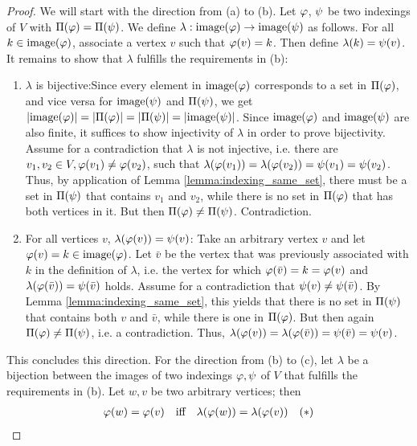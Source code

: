 \begin{proof}
    We will start with the direction from (a) to (b). Let $\varphi$, $\psi$ be two indexings of $V$ with $\Pi(\varphi) = \Pi(\psi)$. We define $\lambda : \mathrm{image}(\varphi)\rightarrow \mathrm{image}(\psi)$ as follows. For all $k \in \mathrm{image}(\varphi)$, associate a vertex $v$ such that $\varphi(v)=k$. Then define $\lambda(k)=\psi(v)$. It remains to show that $\lambda$ fulfills the requirements in (b):
    \begin{enumerate}
        \item $\lambda$ is bijective:\quad Since every element in $\mathrm{image}(\varphi)$ corresponds to a set in $\Pi(\varphi)$, and vice versa for $\mathrm{image}(\psi)$ and $\Pi(\psi)$, we get $|\mathrm{image}(\varphi)|=|\Pi(\varphi)|=|\Pi(\psi)|=|\mathrm{image}(\psi)|$. Since $\mathrm{image}(\varphi)$ and $\mathrm{image}(\psi)$ are also finite, it suffices to show injectivity of $\lambda$ in order to prove bijectivity. Assume for a contradiction that $\lambda$ is not injective, i.e. there are $v_1,v_2 \in V, \varphi(v_1) \neq \varphi(v_2)$, such that $\lambda(\varphi(v_1))=\lambda(\varphi(v_2))=\psi(v_1)=\psi(v_2)$. Thus, by application of Lemma \ref{lemma:indexing_same_set}, there must be a set in $\Pi(\psi)$ that contains $v_1$ and $v_2$, while there is no set in $\Pi(\varphi)$ that has both vertices in it. But then $\Pi(\varphi)\neq \Pi(\psi)$. Contradiction.
        \item For all vertices $v$, $\lambda(\varphi(v)) = \psi(v)$: \quad Take an arbitrary vertex $v$ and let $\varphi(v) = k \in \mathrm{image}(\varphi)$. Let $\bar{v}$ be the vertex that was previously associated with $k$ in the definition of $\lambda$, i.e. the vertex for which $\varphi(\bar{v})=k = \varphi(v)$ and $\lambda(\varphi(\bar{v}))=\psi(\bar{v})$ holds. Assume for a contradiction that $\psi(v)\neq \psi(\bar{v})$. By Lemma \ref{lemma:indexing_same_set}, this yields that there is no set in $\Pi(\psi)$ that contains both $v$ and $\bar{v}$, while there is one in $\Pi(\varphi)$. But then again $\Pi(\varphi) \neq \Pi(\psi)$, i.e. a contradiction. Thus, $\lambda(\varphi(v)) = \lambda(\varphi(\bar{v})) = \psi(\bar{v}) = \psi(v)$. 
    \end{enumerate}
    This concludes this direction. For the direction from (b) to (c), let $\lambda$ be a bijection between the images of two indexings $\varphi, \psi$ of $V$ that fulfills the requirements in (b). Let $w,v$ be two arbitrary vertices; then
    \begin{align*}
        \idx(w) = \idx(v) &\quad\text{iff}\quad \lambda(\idx(w)) = \lambda(\idx(v)) &(*) \\ 

\end{align*}
\end{proof}
